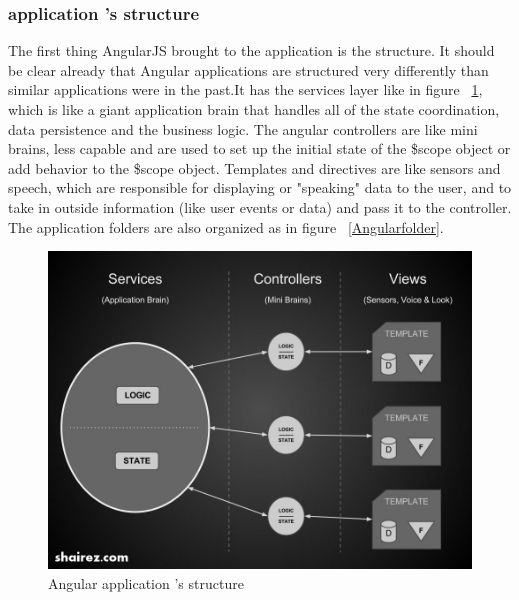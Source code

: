 \documentclass[14pt,a4paper]{extreport}
\begin{document}
			\subsubsection{application 's structure}
			The first thing AngularJS brought to the application is the structure. It should be clear already that Angular applications are structured very differently than similar applications were in the past.It has the services layer like in figure ~\ref{AngularStructure}, which is like a giant application brain that handles all of the state coordination, data persistence and the business logic. The angular controllers are like mini brains, less capable and are used to set up the initial state of the \$scope object or add behavior to the \$scope object. Templates and directives are like sensors and speech, which are responsible for displaying or "speaking" data to the user, and to take in outside information (like user events or data) and pass it to the controller. The application folders are also organized as in figure ~\ref{Angularfolder}.
		
		\begin{figure}
			\begin{center}
				\includegraphics[scale=0.5]{angularArchitect.png}
				\caption{Angular application 's structure}
				\label{AngularStructure}
			\end{center}
		\end{figure}
		
\end{document}
